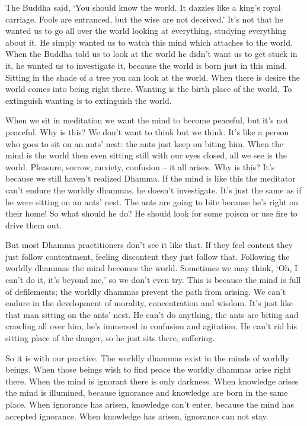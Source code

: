 The Buddha said, `You should know the world. It dazzles like a king's royal carriage. Fools are entranced, but the wise are not deceived.' It's not that he wanted us to go all over the world looking at everything, studying everything about it. He simply wanted us to watch this mind which attaches to the world. When the Buddha told us to look at the world he didn't want us to get stuck in it, he wanted us to investigate it, because the world is born just in this mind. Sitting in the shade of a tree you can look at the world. When there is desire the world comes into being right there. Wanting is the birth place of the world. To extinguish wanting is to extinguish the world. 

When we sit in meditation we want the mind to become peaceful, but it's not peaceful. Why is this? We don't want to think but we think. It's like a person who goes to sit on an ants' nest: the ants just keep on biting him. When the mind is the world then even sitting still with our eyes closed, all we see is the world. Pleasure, sorrow, anxiety, confusion -- it all arises. Why is this? It's because we still haven't realized Dhamma. If the mind is like this the meditator can't endure the worldly dhammas, he doesn't investigate. It's just the same as if he were sitting on an ants' nest. The ants are going to bite because he's right on their home! So what should he do? He should look for some poison or use fire to drive them out. 

But most Dhamma practitioners don't see it like that. If they feel content they just follow contentment, feeling discontent they just follow that. Following the worldly dhammas the mind becomes the world. Sometimes we may think, `Oh, I can't do it, it's beyond me,' so we don't even try. This is because the mind is full of defilements; the worldly dhammas prevent the path from arising. We can't endure in the development of morality, concentration and wisdom. It's just like that man sitting on the ants' nest. He can't do anything, the ants are biting and crawling all over him, he's immersed in confusion and agitation. He can't rid his sitting place of the danger, so he just sits there, suffering. 

So it is with our practice. The worldly dhammas exist in the minds of worldly beings. When those beings wish to find peace the worldly dhammas arise right there. When the mind is ignorant there is only darkness. When knowledge arises the mind is illumined, because ignorance and knowledge are born in the same place. When ignorance has arisen, knowledge can't enter, because the mind has accepted ignorance. When knowledge has arisen, ignorance can not stay. 

